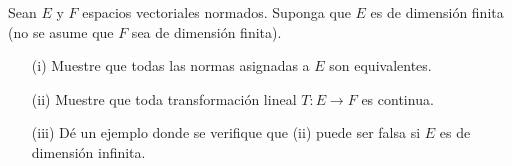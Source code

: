 Sean $E$ y $F$ espacios vectoriales normados. Suponga que $E$ es de dimensión finita (no se asume que $F$ sea de dimensión finita).

\begin{enumerate}
    \item[(i)] Muestre que todas las normas asignadas a $E$ son equivalentes.
    
    \item[(ii)] Muestre que toda transformación lineal $T : E \to F$ es continua.
    
    \item[(iii)] Dé un ejemplo donde se verifique que (ii) puede ser falsa si $E$ es de dimensión infinita.
\end{enumerate}



